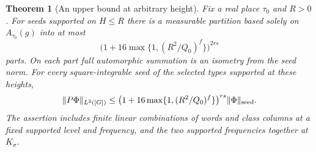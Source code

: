 \documentclass[a4paper,11pt]{article}
\newtheorem{theorem}[proposition]{Theorem}
\theoremstyle{definition}
\theoremstyle{remark}
\numberwithin{equation}{section}
\begin{document}
\begin{theorem}[An upper bound at arbitrary height]
\label{thm:sectors149}
Fix a real place \(\tau_0\) and \(R>0\).
For seeds supported on \(H\le R\) there is a measurable
partition based solely on \(A_{\tau_0}(g)\) into at most
\[
       \bigl(1+16\max\{1,(R^2/Q_0)^f\}\bigr)^{2rs}
\]
parts. On each part full automorphic summation is an isometry
from the seed norm. For every square-integrable seed of the
selected types supported at these heights,
\begin{equation}
     \|P\Phi\|_{L^2([G])}
       \le \bigl(1+16\max\{1,(R^2/Q_0)^f\}\bigr)^{rs}
                  \|\Phi\|_{\rm seed}.
       \label{eq:sectors149}
\end{equation}
The assertion includes finite linear combinations of words
and class columns at a fixed supported level and frequency, and
the two supported frequencies together at \(K_\sigma\).
\end{theorem}
\end{document}
